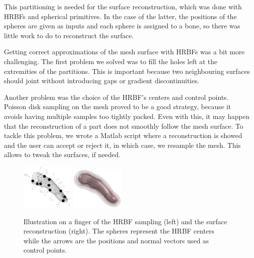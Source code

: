 \documentclass[a4paper,10pt]{article}
\begin{document}
\begin{multicols}{2}
This partitioning is needed for the surface reconstruction, which was done with HRBFs and spherical primitives.
In the case of the latter, the positions of the spheres are given as inputs and each sphere is assigned to a bone, so there was little work to do to reconstruct the surface.

Getting correct approximations of the mesh surface with HRBFs was a bit more challenging.
The first problem we solved was to fill the holes left at the extremities of the partitions.
This is important because two neighbouring surfaces should joint without introducing gaps or gradient discontinuities.

Another problem was the choice of the HRBF's centers and control points.
Poisson disk sampling on the mesh proved to be a good strategy, because it avoids having multiple samples too tightly packed.
Even with this, it may happen that the reconstruction of a part does not smoothly follow the mesh surface.
To tackle this problem, we wrote a Matlab script where a reconstruction is showed and the user can accept or reject it, in which case, we resample the mesh.
This allows to tweak the surfaces, if needed.

\begin{figure}[H]
\centering
\includegraphics[width=0.23\textwidth]{figs/hrbf_centers}
\includegraphics[width=0.23\textwidth]{figs/hrbf_reconstruction}
\caption{Illustration on a finger of the HRBF sampling (left) and the surface reconstruction (right).
The spheres represent the HRBF centers while the arrows are the positions and normal vectors used as control points.}
\end{figure}


\end{multicols}
\end{document}
